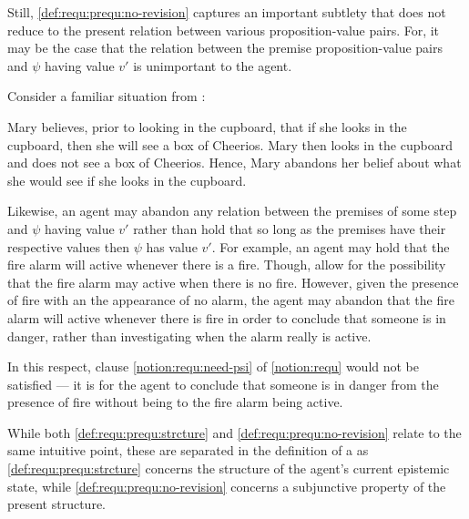 \begin{note}
  Still, \ref{def:requ:prequ:no-revision} captures an important subtlety that does not reduce to the present relation between various proposition-value pairs.
  For, it may be the case that the relation between the premise proposition-value pairs and \(\psi\) having value \(v'\) is unimportant to the agent.

  Consider a familiar situation from \textcite{Harman:1986ux}:

  Mary believes, prior to looking in the cupboard, that if she looks in the cupboard, then she will see a box of Cheerios.
  Mary then looks in the cupboard and does not see a box of Cheerios.
  Hence, Mary abandons her belief about what she would see if she looks in the cupboard.

  Likewise, an agent may abandon any relation between the premises of some step and \(\psi\) having value \(v'\) rather than hold that so long as the premises have their respective values then \(\psi\) has value \(v'\).
  For example, an agent may hold that the fire alarm will active whenever there is a fire.
  Though, allow for the possibility that the fire alarm may active when there is no fire.
  However, given the presence of fire with an the appearance of no alarm, the agent may abandon that the fire alarm will active whenever there is fire in order to conclude that someone is in danger, rather than investigating when the alarm really is active.

  In this respect, clause \ref{notion:requ:need-psi} of \autoref{notion:requ} would not be satisfied --- it is \epVAd{} for the agent to conclude that someone is in danger from the presence of fire without being \committed{} to the fire alarm being active.

  While both \ref{def:requ:prequ:strcture} and \ref{def:requ:prequ:no-revision} relate to the same intuitive point, these are separated in the definition of a \prequ{} as \ref{def:requ:prequ:strcture} concerns the structure of the agent's current epistemic state, while \ref{def:requ:prequ:no-revision} concerns a subjunctive property of the present structure.
\end{note}


